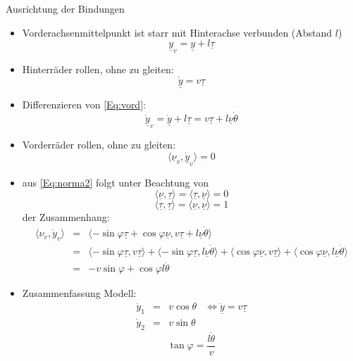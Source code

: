 \documentclass[ngerman]{tudscrreprt}
\begin{document}
Ausrichtung der Bindungen
\begin{itemize}
\item Vorderachsenmittelpunkt ist starr mit Hinterachse verbunden (Abstand $l$)
\begin{equation*}
\underline{y}_v = \underline y + l \underline \tau
\label{Eq:vord}
\tag{3}
\end{equation*}
\item Hinterräder rollen, ohne zu gleiten:
\begin{equation*}
\dot{\underline{y}} = v \underline \tau 
\tag{4}
\end{equation*}
\item Differenzieren von \eqref{Eq:vord}:
\begin{equation*}
\dot{\underline{y}}_v = \dot{\underline y} + l \underline \tau = v \underline \tau + l \underline \nu \dot{\theta}
\tag{5}
\end{equation*}
\item Vorderräder rollen, ohne zu gleiten: 
\begin{equation*}
\langle \underline{\nu}_v, \dot{\underline{y}}_v \rangle = 0
\end{equation*}
\item aus \eqref{Eq:norma2} folgt unter Beachtung von 
\begin{equation*}
\langle \underline{\nu},\underline{\tau}\rangle = \langle \underline \tau , \underline \nu \rangle = 0
\end{equation*}
\begin{equation*}
\langle \underline{\tau},\underline{\tau}\rangle = \langle \underline \nu , \underline \nu \rangle = 1
\end{equation*}
der Zusammenhang: 
\begin{equation*}
\begin{matrix}
\langle \nu_v , \dot{y}_v \rangle &= &\langle -\sin{\varphi}\underline {\tau} + \cos{\varphi}\underline \nu , v\underline \tau + l \underline \nu \dot{\theta}\rangle\\ 
&=& \langle -\sin{\varphi \underline \tau , v \underline \tau \rangle + \langle -\sin{\varphi}}\underline{\tau}, l \underline \nu \dot{\theta} \rangle + \langle \cos{\varphi}\underline \nu , v \underline \tau \rangle + \langle \cos{\varphi}\underline \nu , l \underline \nu \dot{\theta} \rangle \\ 
&=& -v \sin{\varphi} + \cos{\varphi} l \dot{\theta}
\end{matrix}
\tag{6}
\end{equation*}
\item Zusammenfassung Modell: 
\begin{equation*}
\begin{matrix}
\dot y_1 &=& v\cos{\theta}& \Leftrightarrow \dot{\underline y} = v\underline \tau\\ 
\dot y_2 &=& v\sin{\theta}&
\end{matrix}
\tag{7a}
\end{equation*}
\begin{equation*}
\tan{\varphi} = \frac{l\dot{\theta}}{v}
\tag{7b}
\end{equation*}
\end{itemize}
\end{document}

